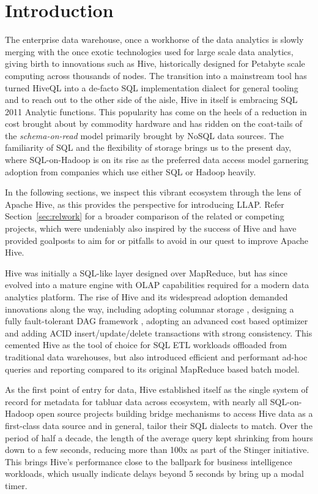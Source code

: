 \section{Introduction}

The enterprise data warehouse, once a workhorse of the data analytics is slowly merging with the once exotic technologies used for large scale data analytics, giving birth to innovations such as Hive, historically designed for Petabyte scale computing across thousands of nodes. 
The transition into a mainstream tool has turned HiveQL into a de-facto SQL implementation dialect for general tooling and to reach out to the other side of the aisle, Hive in itself is embracing SQL 2011 Analytic functions.  
This popularity has come on the heels of a reduction in cost brought about by commodity hardware and has ridden on the coat-tails of the \emph{schema-on-read} model primarily brought by NoSQL data sources. 
The familiarity of SQL and the flexibility of storage brings us to the present day, where SQL-on-Hadoop is on its rise as the preferred data access model garnering adoption from companies which use either SQL or Hadoop heavily.  

In the following sections, we inspect this vibrant ecosystem through the lens of Apache Hive, as this provides the perspective for introducing LLAP. Refer Section~\ref{sec:relwork} for a broader comparison of the related or competing projects, which were undeniably also inspired by the success of Hive and have provided goalposts to aim for or pitfalls to avoid in our quest to improve Apache Hive. 

Hive was initially a SQL-like layer designed over MapReduce, but has since evolved into a mature engine with OLAP capabilities required for a modern data analytics platform.
The rise of Hive and its widespread adoption demanded innovations along the way, including adopting columnar storage \cite{Apache ORC}, designing a fully fault-tolerant DAG framework \cite{Apache Tez}, adopting an advanced cost based optimizer \cite{Apache Calcite} and adding ACID insert/update/delete transactions with strong consistency. This cemented Hive as the tool of choice for SQL ETL workloads offloaded from traditional data warehouses, but also introduced efficient and performant ad-hoc queries and reporting compared to its original MapReduce based batch model.

As the first point of entry for data, Hive established itself as the single system of record for metadata for tabluar data across ecosystem, with nearly all SQL-on-Hadoop open source projects building bridge mechanisms to access Hive data as a first-class data source and in general, tailor their SQL dialects to match. 
Over the period of half a decade, the length of the average query kept shrinking from hours down to a few seconds, reducing more than 100x as part of the Stinger\cite{tez} initiative. This brings Hive's performance close to the ballpark for business intelligence workloads, which usually indicate delays beyond 5 seconds by bring up a modal timer.

